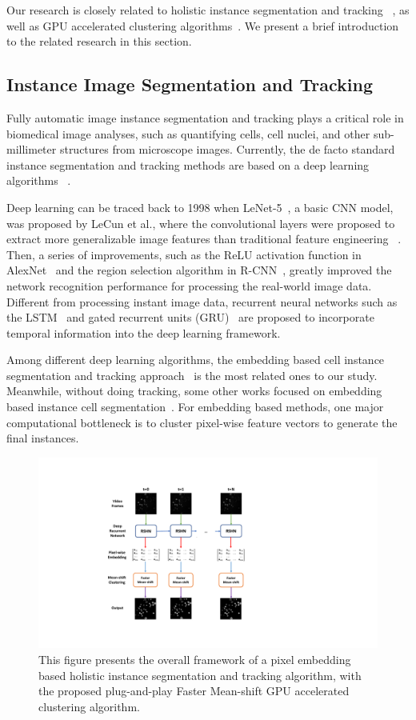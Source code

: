 \documentclass[journal,twoside,web]{ieeecolor}
\begin{document}
Our research is closely related to holistic instance segmentation and tracking ~\cite{b15}, as well as GPU accelerated clustering algorithms~\cite{b18,b19}. We present a brief introduction to the related research in this section.

\subsection{Instance Image Segmentation and Tracking}
Fully automatic image instance segmentation and tracking plays a critical role in biomedical image analyses, such as quantifying cells, cell nuclei, and other sub-millimeter structures from microscope images. Currently, the de facto standard instance segmentation and tracking methods are based on a deep learning algorithms ~\cite{b20}.

Deep learning can be traced back to 1998 when LeNet-5~\cite{b10}, a basic CNN model, was proposed by LeCun et al., where the convolutional layers were proposed to extract more generalizable image features than traditional feature engineering ~\cite{b25}. Then, a series of improvements, such as the ReLU activation function in AlexNet~\cite{b22} and the region selection algorithm in R-CNN~\cite{b23}, greatly improved the network recognition performance for processing the real-world image data. Different from processing instant image data, recurrent neural networks such as the LSTM~\cite{b11} and gated recurrent units (GRU)~\cite{b24} are proposed to incorporate temporal information into the deep learning framework.

Among different deep learning algorithms, the embedding based cell instance segmentation and tracking approach~\cite{b15} is the most related ones to our study. Meanwhile, without doing tracking, some other works focused on embedding based instance cell segmentation~\cite{b40,b41}. For embedding based methods, one major computational bottleneck is to cluster pixel-wise feature vectors to generate the final instances.

\begin{figure}[h]
\centerline{\includegraphics[width=\columnwidth]{2.pdf}}
\caption{This figure presents the overall framework of a pixel embedding based holistic instance segmentation and tracking algorithm, with the proposed plug-and-play Faster Mean-shift GPU accelerated clustering algorithm.}
\label{fig2}
\end{figure}
\end{document}

